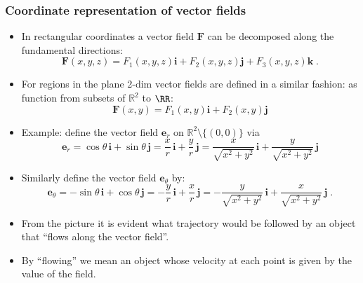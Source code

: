 \begin{frame}
\frametitle{Coordinate representation of vector fields}

\begin{itemize}
\item<1-> In rectangular coordinates a vector field $\textbf{F}$ can
be decomposed along the fundamental directions:
$$
\textbf{F}(x,y,z) = F_1(x,y,z) \textbf{i} + F_2(x,y,z) \textbf{j} + F_3(x,y,z) \textbf{k} \; .
$$
\item<2-> For regions in the plane 2-dim vector fields are defined in a similar fashion: as function from subsets of $\mathbb R^2$ to $\RR$:
$$
\textbf{F}(x,y) = F_1(x,y) \textbf{i} + F_2(x,y) \textbf{j}
$$


\end{itemize}
\end{frame}
\begin{frame}
\begin{itemize}
\item<1-> Example: define the vector field $\textbf{e}_r$ on $\mathbb{R}^2 \setminus \{ (0,0)\}$ via
\[
\textbf{e}_r = \cos\theta\, \textbf{i} +
\sin\theta \,\textbf{j} = \frac{x}{r} \, \textbf{i} +
\frac{y}{r} \, \textbf{j} = \frac{x}{\sqrt{x^2+y^2}} \,
\textbf{i} + \frac{y}{\sqrt{x^2+y^2}} \, \textbf{j}
\]

\item<2-> Similarly define the vector field $\textbf{e}_{\theta}$ by:
\[\textbf{e}_\theta = -\sin\theta\, \textbf{i} +
\cos\theta \,\textbf{j} = -\frac{y}{r} \, \textbf{i} +
\frac{x}{r} \, \textbf{j} = -\frac{y}{\sqrt{x^2+y^2}} \,
\textbf{i} + \frac{x}{\sqrt{x^2+y^2}} \, \textbf{j} \; .
\]
\item<4-> From the picture it is evident what trajectory would be followed by an object that ``\alert<5>{flows along the vector field}''.
\item<5-> By ``\alert<5>{flowing}'' we mean an object whose \alert<5>{velocity} at each point is given by \alert<5>{the value of the field}.
\end{itemize}
\end{frame}
